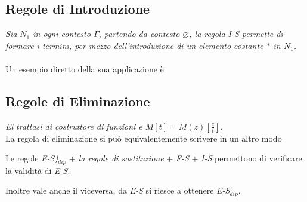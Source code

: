 \documentclass[10pt,a4paper, italian]{book}
\begin{document}
{{{\subsection{Regole di Introduzione}
\label{subsec:introduzione}
\begin{prooftree}
\end{prooftree}
\textit{Sia $N_1$ in ogni contesto $\Gamma$, partendo da contesto $\varnothing$, la regola I-S permette di formare i termini, per mezzo dell'introduzione di un elemento costante $\ast$ in $N_1$.}\\\\
Un esempio diretto della sua applicazione \`e
\begin{prooftree}
\end{prooftree}

\subsection{Regole di Eliminazione}
\label{subsec:eliminazione}
\begin{prooftree}
\end{prooftree}
\noindent
\textit{El trattasi di costruttore di funzioni e $M[t] = M(z)[\frac{z}{t}]$.}
\\
La regola di eliminazione si pu\`o equivalentemente scrivere in un altro modo
\begin{prooftree}
\end{prooftree}
Le regole \textit{E-S)$_{dip}$} + \textit{la regole di sostituzione} + \textit{F-S} + \textit{I-S} permettono di verificare la validit\`a di \textit{E-S}.
\begin{prooftree}
\end{prooftree}
\noindent
Inoltre vale anche il viceversa, da \textit{E-S} si riesce a ottenere \textit{E-S$_{dip}$}.
}}}
\end{document}
